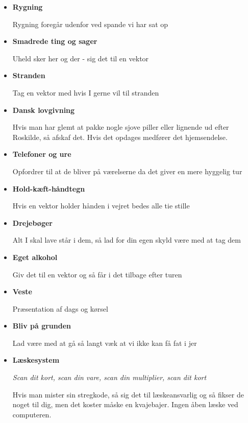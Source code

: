\begin{itemize}
    \item \textbf{Rygning}
    
    Rygning foregår udenfor ved spande vi har sat op
    
    \item \textbf{Smadrede ting og sager}
    
    Uheld sker her og der - sig det til en vektor
    
    \item \textbf{Stranden}
    
    Tag en vektor med hvis I gerne vil til stranden
    
    \item \textbf{Dansk lovgivning}
    
    Hvis man har glemt at pakke nogle sjove piller eller lignende ud efter Roskilde, så afskaf det. Hvis det opdages medfører det hjemsendelse.
    
    
    \item \textbf{Telefoner og ure}
    
    Opfordrer til at de bliver på værelserne da det giver en mere hyggelig tur
    
    
    \item \textbf{Hold-kæft-håndtegn}
    
    Hvis en vektor holder hånden i vejret bedes alle tie stille
    
    
    \item \textbf{Drejebøger}
    
    Alt I skal lave står i dem, så lad for din egen skyld være med at tag dem
    
    
    \item \textbf{Eget alkohol}
    
    Giv det til en vektor og så får i det tilbage efter turen
    
    
    \item \textbf{Veste}
    
    Præsentation af dags og kørsel
    
    \item \textbf{Bliv på grunden}
    
    Lad være med at gå så langt væk at vi ikke kan få fat i jer
    
    
    \item \textbf{Læskesystem}
    
    \textit{Scan dit kort, scan din vare, scan din multiplier, scan dit kort}
    
    Hvis man mister sin stregkode, så sig det til læskeansvarlig og så fikser de noget til dig, men det koster måske en kvajebajer. Ingen åben læske ved computeren.
\end{itemize}

